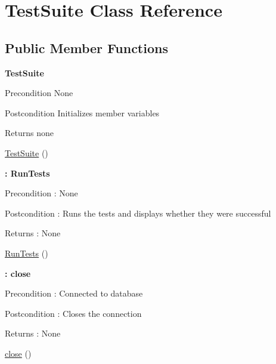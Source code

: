 \hypertarget{class_test_suite}{}\section{Test\+Suite Class Reference}
\label{class_test_suite}
\subsection*{Public Member Functions}
\begin{Indent}{\bf Test\+Suite}\par
{\em \begin{DoxyPrecond}{Precondition}
None 
\end{DoxyPrecond}
\begin{DoxyPostcond}{Postcondition}
Initializes member variables 
\end{DoxyPostcond}
\begin{DoxyReturn}{Returns}
none 
\end{DoxyReturn}
}\begin{DoxyCompactItemize}
\item 
\hyperlink{class_test_suite_abc8126fceba23a7a21730d962f483f11}{Test\+Suite} ()
\end{DoxyCompactItemize}
\end{Indent}
\begin{Indent}{\bf \+: Run\+Tests}\par
{\em \begin{DoxyPrecond}{Precondition}
\+: None 
\end{DoxyPrecond}
\begin{DoxyPostcond}{Postcondition}
\+: Runs the tests and displays whether they were successful 
\end{DoxyPostcond}
\begin{DoxyReturn}{Returns}
\+: None 
\end{DoxyReturn}
}\begin{DoxyCompactItemize}
\item 
\hyperlink{class_test_suite_a413ba6fa9ee004a993af4c8f8fca736d}{Run\+Tests} ()
\end{DoxyCompactItemize}
\end{Indent}
\begin{Indent}{\bf \+: close}\par
{\em \begin{DoxyPrecond}{Precondition}
\+: Connected to database 
\end{DoxyPrecond}
\begin{DoxyPostcond}{Postcondition}
\+: Closes the connection 
\end{DoxyPostcond}
\begin{DoxyReturn}{Returns}
\+: None 
\end{DoxyReturn}
}\begin{DoxyCompactItemize}
\item 
\hyperlink{class_test_suite_aa69c8bf1f1dcf4e72552efff1fe3e87e}{close} ()
\end{DoxyCompactItemize}
\end{Indent}


